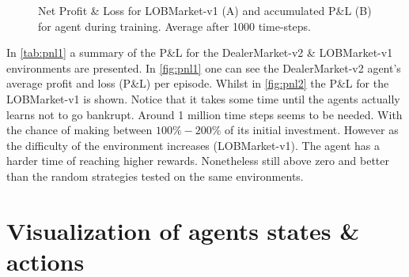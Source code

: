 \documentclass{kththesis}
\theoremstyle{definition}
\begin{document}
\begin{figure}[H]
    \centering
    
    \caption{Net Profit \& Loss for LOBMarket-v1 (A) and accumulated P\&L (B) for agent during training. Average after 1000 time-steps.}
    \label{fig:pnl2}
\end{figure}
In \autoref{tab:pnl1} a summary of the P\&L for the DealerMarket-v2 \& LOBMarket-v1 environments are presented. In \autoref{fig:pnl1} one can see the DealerMarket-v2 agent's average profit and loss (P\&L) per episode. Whilst in \autoref{fig:pnl2} the P\&L for the LOBMarket-v1 is shown.  Notice that it takes some time until the agents actually learns not to go bankrupt. Around 1 million time steps seems to be needed. With the chance of making between $100\%-200\%$ of its initial investment. However as the difficulty of the environment increases (LOBMarket-v1). The agent has a harder time of reaching higher rewards. Nonetheless still above zero and better than the random strategies tested on the same environments.  

\section{Visualization of agents states \& actions}
\end{document}
